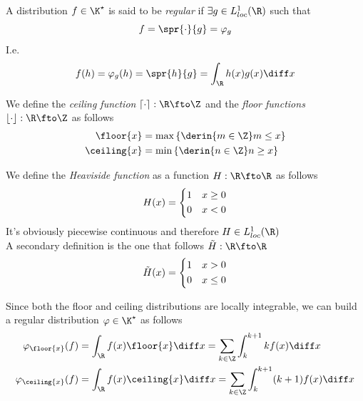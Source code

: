 \documentclass[../mmf.tex]{subfiles}
\begin{document}
\begin{dfn}
	A distribution $f\in\K^\star$ is said to be \textit{regular} if $\exists g\in L^1_{loc}(\R)$ such that
	\begin{equation*}
		f=\spr{\cdot}{g}=\varphi_g
	\end{equation*}
	I.e.
	\begin{equation*}
		f(h)=\varphi_g(h)=\spr{h}{g}=\int_{\R}^{}h(x)g(x)\diff x
	\end{equation*}
\end{dfn}
\begin{dfn}
	We define the \textit{ceiling function} $\lceil\cdot\rceil:\R\fto\Z$ and the \textit{floor functions} $\lfloor\cdot\rfloor:\R\fto\Z$ as follows
	\begin{equation}
		\begin{aligned}
			\floor{x}&=\max\left\{ \derin{m\in\Z}m\le x \right\}\\
			\ceiling{x}&=\min\left\{ \derin{n\in\Z}n\ge x \right\}
		\end{aligned}
		\label{eq:floorceil}
	\end{equation}
\end{dfn}
\begin{dfn}
	We define the \textit{Heaviside function} as a function $H:\R\fto\R$ as follows
	\begin{equation*}
		H(x)=\begin{dcases}1&x\ge0\\0&x<0\end{dcases}
	\end{equation*}
	It's obviously piecewise continuous and therefore $H\in L^1_{loc}(\R)$\\
	A secondary definition is the one that follows $\tilde{H}:\R\fto\R$
	\begin{equation*}
		\tilde{H}(x)=\begin{dcases}1&x>0\\0&x\le0\end{dcases}
	\end{equation*}
\end{dfn}
\begin{eg}
	Since both the floor and ceiling distributions are locally integrable, we can build a regular distribution $\varphi\in\K^\star$ as follows
	\begin{equation*}
		\begin{aligned}
			\varphi_{\floor{x}}(f)&=\int_{\R}^{}f(x)\floor{x}\diff x=\sum_{k\in\Z}\int_{k}^{k+1}kf(x)\diff x\\
			\varphi_{\ceiling{x}}(f)&=\int_{\R}^{}f(x)\ceiling{x}\diff x=\sum_{k\in\Z}\int_{k}^{k+1}(k+1)f(x)\diff x
		\end{aligned}
	\end{equation*}
\end{eg}
\end{document}

